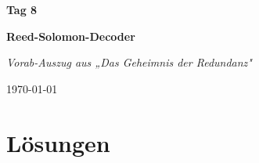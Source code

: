 \documentclass[
  11pt,
  a4paper,
  twoside,
  parskip=half,
  numbers=noenddot,
  open=right,
]{scrbook}
\begin{document}
\frontmatter

\begin{titlepage}
  \centering
  \vspace*{5cm}
  {\Huge\bfseries Tag 8\par}
  \vspace{0.6cm}
  {\Large\bfseries Reed-Solomon-Decoder\par}
  \vspace{1.2cm}
  {\Large\itshape Vorab-Auszug aus „Das Geheimnis der Redundanz"\par}
  \vfill
  {\large \today\par}
  \vspace*{1.5cm}
\end{titlepage}

\mainmatter
\setcounter{chapter}{7}


\appendix
\chapter*{Lösungen}

\end{document}
